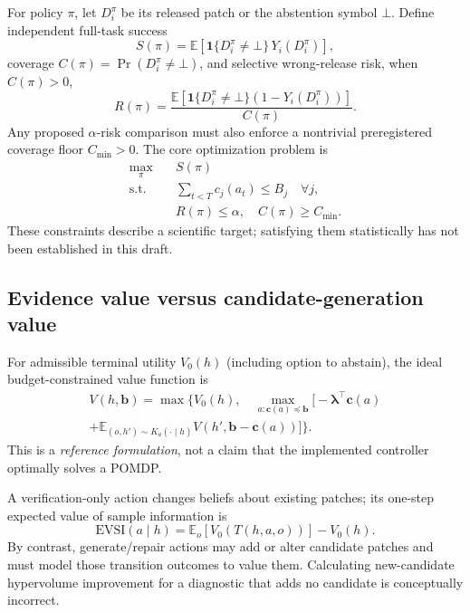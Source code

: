 \documentclass[pdflatex,sn-basic]{sn-jnl}
\begin{document}
For policy $\pi$, let $D_i^\pi$ be its released patch or the abstention
symbol $\bot$. Define independent full-task success
\begin{equation}
 S(\pi)=\mathbb E\!\left[
  \mathbf 1\{D_i^\pi\ne\bot\}\,Y_i(D_i^\pi)\right],
 \label{eq:success}
\end{equation}
coverage $C(\pi)=\Pr(D_i^\pi\ne\bot)$, and selective
wrong-release risk, when $C(\pi)>0$,
\begin{equation}
 R(\pi)=
 \frac{\mathbb E[
  \mathbf 1\{D_i^\pi\ne\bot\}(1-Y_i(D_i^\pi))]}
 {C(\pi)}.
 \label{eq:risk}
\end{equation}
Any proposed $\alpha$-risk comparison must also enforce a
nontrivial preregistered coverage floor $C_{\min}>0$.
The core optimization problem is
\begin{align}
 \max_{\pi}\quad & S(\pi) \nonumber\\
 \mathrm{s.t.}\quad &
 \sum_{t<T}c_j(a_t)\le B_j\quad\forall j,\nonumber\\
 & R(\pi)\le\alpha,\quad C(\pi)\ge C_{\min}.
 \label{eq:objective}
\end{align}
These constraints describe a scientific target; satisfying them
statistically has not been established in this draft.

\subsection{Evidence value versus candidate-generation value}

For admissible terminal utility $V_0(h)$ (including option to abstain),
the ideal budget-constrained value function is
\begin{equation}
\begin{split}
 V(h,\mathbf b)=\max\bigl\{V_0(h),\quad
  \max_{a:\mathbf c(a)\preceq\mathbf b}
 \bigl[-\boldsymbol\lambda^\top\mathbf c(a)\\
 +\mathbb E_{(o,h')\sim K_a(\cdot\mid h)}
 V(h',\mathbf b-\mathbf c(a))\bigr]\bigr\}.
\end{split}
\label{eq:bellman}
\end{equation}
This is a \emph{reference formulation}, not a claim that the implemented
controller optimally solves a POMDP.

A verification-only action changes beliefs about existing patches;
its one-step expected value of sample information is
\begin{equation}
 \mathrm{EVSI}(a\mid h)=
 \mathbb E_o[V_0(T(h,a,o))]-V_0(h).
 \label{eq:evsi}
\end{equation}
By contrast, generate/repair actions may add or alter candidate patches
and must model those transition outcomes to value them.
Calculating new-candidate hypervolume improvement for a diagnostic
that adds no candidate is conceptually incorrect.
\end{document}
